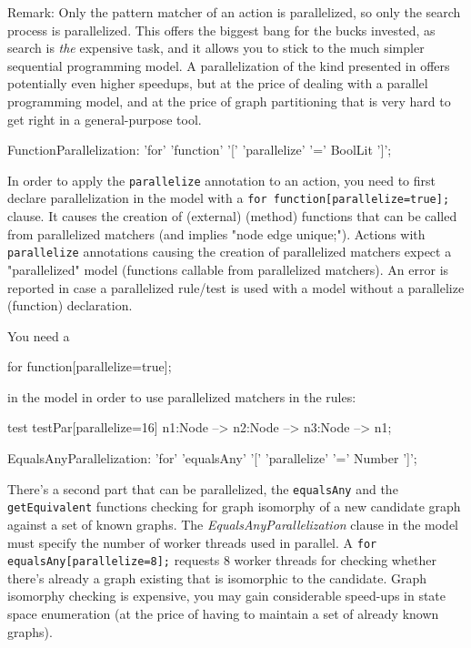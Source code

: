 Remark: Only the pattern matcher of an action is parallelized, so only the search process is parallelized.
This offers the biggest bang for the bucks invested, as search is \emph{the} expensive task, and it allows you to stick to the much simpler sequential programming model.
A parallelization of the kind presented in \cite{ParGraErs} offers potentially even higher speedups, but at the price of dealing with a parallel programming model, and at the price of graph partitioning that is very hard to get right in a general-purpose tool.

\begin{rail}
  FunctionParallelization: 'for' 'function' '[' 'parallelize' '=' BoolLit ']';
\end{rail}

In order to apply the \texttt{parallelize} annotation to an action, you need to first declare parallelization in the model with a \verb#for function[parallelize=true];# clause.
It causes the creation of (external) (method) functions that can be called from parallelized matchers (and implies "node edge unique;").
Actions with \texttt{parallelize} annotations causing the creation of parallelized matchers expect a "parallelized" model (functions callable from parallelized matchers).
An error is reported in case a parallelized rule/test is used with a model without a parallelize (function) declaration.

\begin{example}
You need a
\begin{grgen}
for function[parallelize=true];
\end{grgen}
in the model in order to use parallelized matchers in the rules:
\begin{grgen}
test testPar[parallelize=16]
{
	n1:Node --> n2:Node --> n3:Node --> n1;
}
\end{grgen}
\end{example}

\begin{rail}
  EqualsAnyParallelization: 'for' 'equalsAny' '[' 'parallelize' '=' Number ']';
\end{rail}

There's a second part that can be parallelized, the \texttt{equalsAny} and the \texttt{getEquivalent} functions checking for graph isomorphy of a new candidate graph against a set of known graphs.
The \emph{EqualsAnyParallelization} clause in the model must specify the number of worker threads used in parallel.
A \verb#for equalsAny[parallelize=8];# requests 8 worker threads for checking whether there's already a graph existing that is isomorphic to the candidate.
Graph isomorphy checking is expensive, you may gain considerable speed-ups in state space enumeration (at the price of having to maintain a set of already known graphs).

